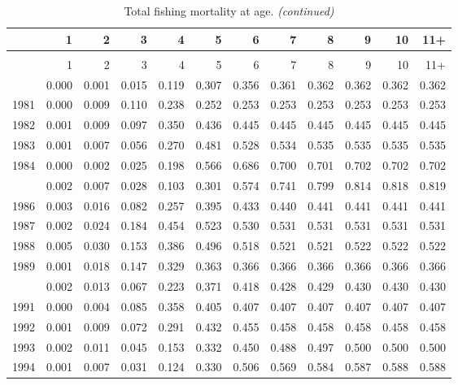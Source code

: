 \documentclass[
]{article}
\begin{document}
\begin{longtable}[t]{lrrrrrrrrrrr}
\caption{\label{tab:FAA-tot-table}Total fishing mortality at age.}\\
\toprule
  & 1 & 2 & 3 & 4 & 5 & 6 & 7 & 8 & 9 & 10 & 11+\\
\midrule
\endfirsthead
\caption[]{Total fishing mortality at age. \textit{(continued)}}\\
\toprule
  & 1 & 2 & 3 & 4 & 5 & 6 & 7 & 8 & 9 & 10 & 11+\\
\midrule
\endhead

\endfoot
\bottomrule
\endlastfoot
1980 & 0.000 & 0.001 & 0.015 & 0.119 & 0.307 & 0.356 & 0.361 & 0.362 & 0.362 & 0.362 & 0.362\\
1981 & 0.000 & 0.009 & 0.110 & 0.238 & 0.252 & 0.253 & 0.253 & 0.253 & 0.253 & 0.253 & 0.253\\
1982 & 0.001 & 0.009 & 0.097 & 0.350 & 0.436 & 0.445 & 0.445 & 0.445 & 0.445 & 0.445 & 0.445\\
1983 & 0.001 & 0.007 & 0.056 & 0.270 & 0.481 & 0.528 & 0.534 & 0.535 & 0.535 & 0.535 & 0.535\\
1984 & 0.000 & 0.002 & 0.025 & 0.198 & 0.566 & 0.686 & 0.700 & 0.701 & 0.702 & 0.702 & 0.702\\
\addlinespace
1985 & 0.002 & 0.007 & 0.028 & 0.103 & 0.301 & 0.574 & 0.741 & 0.799 & 0.814 & 0.818 & 0.819\\
1986 & 0.003 & 0.016 & 0.082 & 0.257 & 0.395 & 0.433 & 0.440 & 0.441 & 0.441 & 0.441 & 0.441\\
1987 & 0.002 & 0.024 & 0.184 & 0.454 & 0.523 & 0.530 & 0.531 & 0.531 & 0.531 & 0.531 & 0.531\\
1988 & 0.005 & 0.030 & 0.153 & 0.386 & 0.496 & 0.518 & 0.521 & 0.521 & 0.522 & 0.522 & 0.522\\
1989 & 0.001 & 0.018 & 0.147 & 0.329 & 0.363 & 0.366 & 0.366 & 0.366 & 0.366 & 0.366 & 0.366\\
\addlinespace
1990 & 0.002 & 0.013 & 0.067 & 0.223 & 0.371 & 0.418 & 0.428 & 0.429 & 0.430 & 0.430 & 0.430\\
1991 & 0.000 & 0.004 & 0.085 & 0.358 & 0.405 & 0.407 & 0.407 & 0.407 & 0.407 & 0.407 & 0.407\\
1992 & 0.001 & 0.009 & 0.072 & 0.291 & 0.432 & 0.455 & 0.458 & 0.458 & 0.458 & 0.458 & 0.458\\
1993 & 0.002 & 0.011 & 0.045 & 0.153 & 0.332 & 0.450 & 0.488 & 0.497 & 0.500 & 0.500 & 0.500\\
1994 & 0.001 & 0.007 & 0.031 & 0.124 & 0.330 & 0.506 & 0.569 & 0.584 & 0.587 & 0.588 & 0.588\\

\end{longtable}
\end{document}
